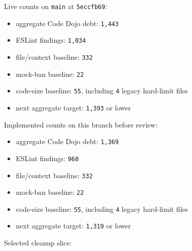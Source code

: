 Live counts on \texttt{m\allowbreak{}a\allowbreak{}i\allowbreak{}n} at \texttt{5\allowbreak{}e\allowbreak{}c\allowbreak{}c\allowbreak{}f\allowbreak{}b\allowbreak{}6\allowbreak{}9}:

\begin{itemize}
\tightlist
\item
  aggregate Code Dojo debt: \texttt{1\allowbreak{},\allowbreak{}4\allowbreak{}4\allowbreak{}3}
\item
  ESLint findings: \texttt{1\allowbreak{},\allowbreak{}0\allowbreak{}3\allowbreak{}4}
\item
  file/context baseline: \texttt{3\allowbreak{}3\allowbreak{}2}
\item
  mock-ban baseline: \texttt{2\allowbreak{}2}
\item
  code-size baseline: \texttt{5\allowbreak{}5}, including \texttt{4} legacy hard-limit files
\item
  next aggregate target: \texttt{1\allowbreak{},\allowbreak{}3\allowbreak{}9\allowbreak{}3} or lower
\end{itemize}

Implemented counts on this branch before review:

\begin{itemize}
\tightlist
\item
  aggregate Code Dojo debt: \texttt{1\allowbreak{},\allowbreak{}3\allowbreak{}6\allowbreak{}9}
\item
  ESLint findings: \texttt{9\allowbreak{}6\allowbreak{}0}
\item
  file/context baseline: \texttt{3\allowbreak{}3\allowbreak{}2}
\item
  mock-ban baseline: \texttt{2\allowbreak{}2}
\item
  code-size baseline: \texttt{5\allowbreak{}5}, including \texttt{4} legacy hard-limit files
\item
  next aggregate target: \texttt{1\allowbreak{},\allowbreak{}3\allowbreak{}1\allowbreak{}9} or lower
\end{itemize}

Selected cleanup slice:

